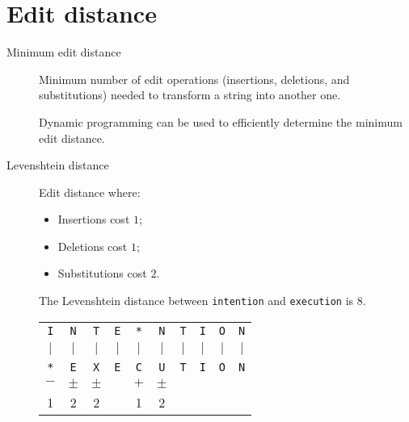 \section{Edit distance}

\begin{description}
    \item[Minimum edit distance] 
        Minimum number of edit operations (insertions, deletions, and substitutions) needed to transform a string into another one.

        \begin{remark}
            Dynamic programming can be used to efficiently determine the minimum edit distance.
        \end{remark}

    \item[Levenshtein distance] 
        Edit distance where:
        \begin{itemize}
            \item Insertions cost $1$;
            \item Deletions cost $1$;
            \item Substitutions cost $2$.
        \end{itemize}

        \begin{example}
            The Levenshtein distance between \texttt{intention} and \texttt{execution} is $8$.
            \begin{table}[H]
                \centering
                \begin{tabular}{cccccccccc}
                    \texttt{I} & \texttt{N} & \texttt{T} & \texttt{E} & \texttt{*} & \texttt{N} & \texttt{T} & \texttt{I} & \texttt{O} & \texttt{N} \\
                    $\vert$ & $\vert$ & $\vert$ & $\vert$ & $\vert$ & $\vert$ & $\vert$ & $\vert$ & $\vert$ & $\vert$ \\
                    \texttt{*} & \texttt{E} & \texttt{X} & \texttt{E} & \texttt{C} & \texttt{U} & \texttt{T} & \texttt{I} & \texttt{O} & \texttt{N} \\
                    $-$ & $\pm$ & $\pm$ &  & $+$ & $\pm$ \\
                    1 & 2 & 2 &  & 1 & 2 \\
                \end{tabular}
            \end{table}
        \end{example}
\end{description}

